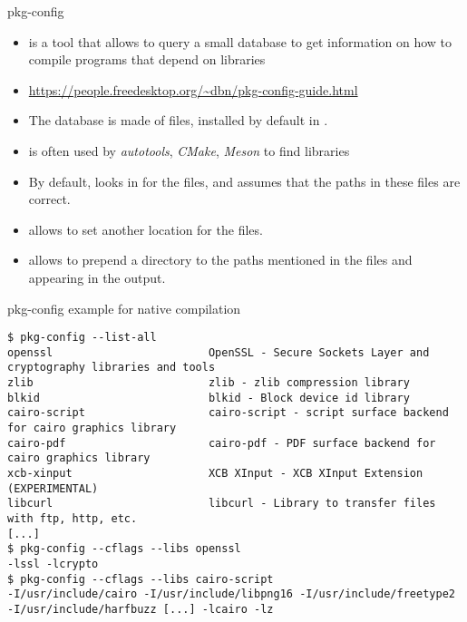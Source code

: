\begin{frame}{pkg-config}
  \begin{itemize}
  \item {} is a tool that allows to query a small
    database to get information on how to compile programs that depend
    on libraries
  \item \url{https://people.freedesktop.org/~dbn/pkg-config-guide.html}
  \item The database is made of  files, installed by default in
    .
  \item {} is often used by {\em autotools}, {\em
      CMake}, {\em Meson} to find libraries
  \item By default,  looks in
     for the  files, and assumes
    that the paths in these files are correct.
  \item {} allows to set another location for the
     files.
  \item {} allows to prepend a directory to the
    paths mentioned in the  files and appearing in the
     output.
  \end{itemize}
\end{frame}

\begin{frame}[fragile]{pkg-config example for native compilation}
  \begin{block}{}
    {\tiny
\begin{verbatim}
$ pkg-config --list-all
openssl                        OpenSSL - Secure Sockets Layer and cryptography libraries and tools
zlib                           zlib - zlib compression library
blkid                          blkid - Block device id library
cairo-script                   cairo-script - script surface backend for cairo graphics library
cairo-pdf                      cairo-pdf - PDF surface backend for cairo graphics library
xcb-xinput                     XCB XInput - XCB XInput Extension (EXPERIMENTAL)
libcurl                        libcurl - Library to transfer files with ftp, http, etc.
[...]
$ pkg-config --cflags --libs openssl
-lssl -lcrypto
$ pkg-config --cflags --libs cairo-script
-I/usr/include/cairo -I/usr/include/libpng16 -I/usr/include/freetype2 -I/usr/include/harfbuzz [...] -lcairo -lz
\end{verbatim}
    }
  \end{block}
\end{frame}

